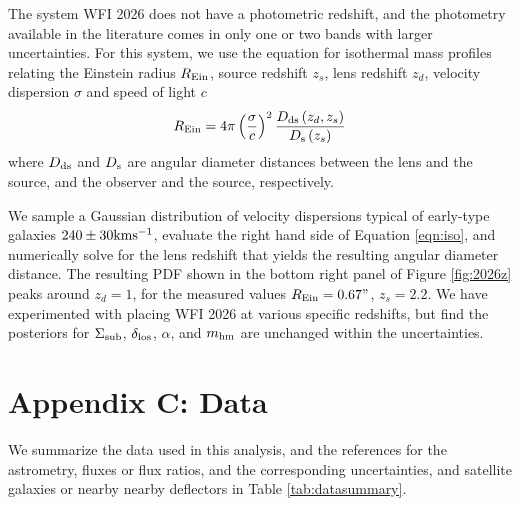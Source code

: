 The system WFI 2026 does not have a photometric redshift, and the photometry available in the literature comes in only one or two bands with larger uncertainties. For this system, we use the equation for isothermal mass profiles relating the Einstein radius $R_{\rm{Ein}} $, source redshift $z_s$, lens redshift $z_d$, velocity dispersion $\sigma$ and speed of light $c$
\begin{equation}
\label{eqn:iso}
R_{\rm{Ein}} = 4 \pi \left(\frac{\sigma}{c}\right)^2 \frac{D_{\rm{ds}}\left(z_d, z_s\right)}{D_{\rm{s}}\left(z_s\right)}
\end{equation}
where $D_{\rm{ds}}$ and $D_{\rm{s}}$ are angular diameter distances between the lens and the source, and the observer and the source, respectively. 

We sample a Gaussian distribution of velocity dispersions typical of early-type galaxies $240 \pm 30 \rm{km} \rm{s^{-1}}$, evaluate the right hand side of Equation \ref{eqn:iso}, and numerically solve for the lens redshift that yields the resulting angular diameter distance. The resulting PDF shown in the bottom right panel of Figure \ref{fig:2026z} peaks around $z_d=1$, for the measured values $R_{\rm{Ein}}  = 0.67"$, $z_s = 2.2$. We have experimented with placing WFI 2026 at various specific redshifts, but find the posteriors for $\Sigma_{\rm{sub}}$, $\delta_{\rm{los}}$, $\alpha$, and ${m_{\rm{hm}}}$ are unchanged within the uncertainties.

\section{Appendix C: Data}
\label{app:C}
We summarize the data used in this analysis, and the references for the astrometry, fluxes or flux ratios, and the corresponding uncertainties, and satellite galaxies or nearby nearby deflectors in Table \ref{tab:datasummary}. 

